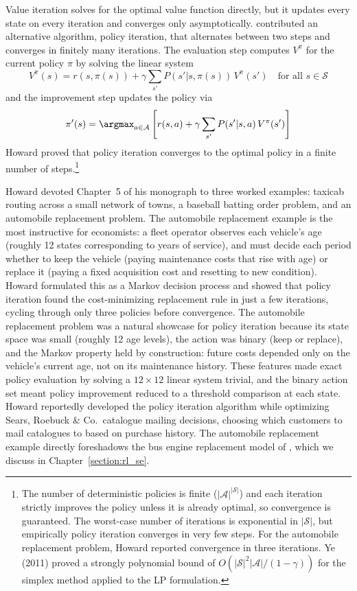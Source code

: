 Value iteration solves for the optimal value function directly, but it updates every state on every iteration and converges only asymptotically. \citet{howard1960} contributed an alternative algorithm, policy iteration, that alternates between two steps and converges in finitely many iterations. The evaluation step computes $V^\pi$ for the current policy $\pi$ by solving the linear system
\begin{equation}
V^\pi(s) = r(s, \pi(s)) + \gamma \sum_{s'} P(s'|s, \pi(s)) \, V^\pi(s') \quad \text{for all } s \in \mathcal{S}
\end{equation}
and the improvement step updates the policy via
\begin{equation}
\pi'(s) = \argmax_{a \in \mathcal{A}} \left[ r(s,a) + \gamma \sum_{s'} P(s'|s,a) \, V^\pi(s') \right]
\end{equation}
Howard proved that policy iteration converges to the optimal policy in a finite number of steps.\footnote{The number of deterministic policies is finite ($|\mathcal{A}|^{|\mathcal{S}|}$) and each iteration strictly improves the policy unless it is already optimal, so convergence is guaranteed. The worst-case number of iterations is exponential in $|\mathcal{S}|$, but empirically policy iteration converges in very few steps. For the automobile replacement problem, Howard reported convergence in three iterations. Ye (2011) proved a strongly polynomial bound of $O(|\mathcal{S}|^2 |\mathcal{A}| / (1 - \gamma))$ for the simplex method applied to the LP formulation.}

Howard devoted Chapter~5 of his monograph to three worked examples: taxicab routing across a small network of towns, a baseball batting order problem, and an automobile replacement problem. The automobile replacement example is the most instructive for economists: a fleet operator observes each vehicle's age (roughly 12 states corresponding to years of service), and must decide each period whether to keep the vehicle (paying maintenance costs that rise with age) or replace it (paying a fixed acquisition cost and resetting to new condition). Howard formulated this as a Markov decision process and showed that policy iteration found the cost-minimizing replacement rule in just a few iterations, cycling through only three policies before convergence. The automobile replacement problem was a natural showcase for policy iteration because its state space was small (roughly 12 age levels), the action was binary (keep or replace), and the Markov property held by construction: future costs depended only on the vehicle's current age, not on its maintenance history. These features made exact policy evaluation by solving a $12 \times 12$ linear system trivial, and the binary action set meant policy improvement reduced to a threshold comparison at each state. Howard reportedly developed the policy iteration algorithm while optimizing Sears, Roebuck \& Co.\ catalogue mailing decisions, choosing which customers to mail catalogues to based on purchase history. The automobile replacement example directly foreshadows the bus engine replacement model of \citet{Rust1987}, which we discuss in Chapter~\ref{section:rl_se}.

